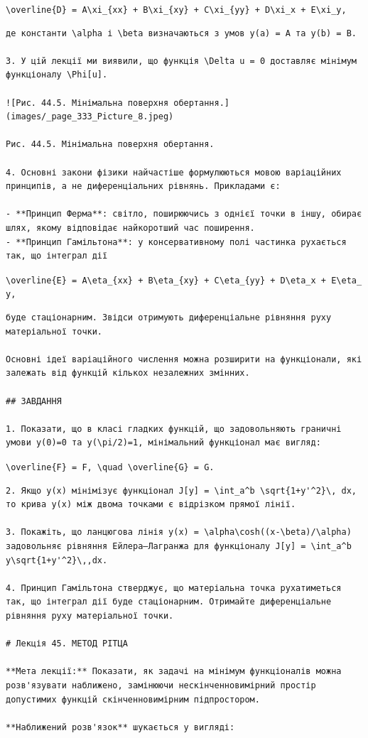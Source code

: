 \documentclass[
  ukrainian,
]{article}
\begin{document}
\texttt{\textbackslash{}overline\{D\}\ =\ A\textbackslash{}xi\_\{xx\}\ +\ B\textbackslash{}xi\_\{xy\}\ +\ C\textbackslash{}xi\_\{yy\}\ +\ D\textbackslash{}xi\_x\ +\ E\textbackslash{}xi\_y,}

\begin{verbatim}
де константи \alpha і \beta визначаються з умов y(a) = A та y(b) = B.

3. У цій лекції ми виявили, що функція \Delta u = 0 доставляє мінімум функціоналу \Phi[u].

![Рис. 44.5. Мінімальна поверхня обертання.](images/_page_333_Picture_8.jpeg)

Рис. 44.5. Мінімальна поверхня обертання.

4. Основні закони фізики найчастіше формулюються мовою варіаційних принципів, а не диференціальних рівнянь. Прикладами є:

- **Принцип Ферма**: світло, поширюючись з однієї точки в іншу, обирає шлях, якому відповідає найкоротший час поширення.
- **Принцип Гамільтона**: у консервативному полі частинка рухається так, що інтеграл дії
\end{verbatim}

\texttt{\textbackslash{}overline\{E\}\ =\ A\textbackslash{}eta\_\{xx\}\ +\ B\textbackslash{}eta\_\{xy\}\ +\ C\textbackslash{}eta\_\{yy\}\ +\ D\textbackslash{}eta\_x\ +\ E\textbackslash{}eta\_y,}

\begin{verbatim}
буде стаціонарним. Звідси отримують диференціальне рівняння руху матеріальної точки.

Основні ідеї варіаційного числення можна розширити на функціонали, які залежать від функцій кількох незалежних змінних.

## ЗАВДАННЯ

1. Показати, що в класі гладких функцій, що задовольняють граничні умови y(0)=0 та y(\pi/2)=1, мінімальний функціонал має вигляд:
\end{verbatim}

\texttt{\textbackslash{}overline\{F\}\ =\ F,\ \textbackslash{}quad\ \textbackslash{}overline\{G\}\ =\ G.}

\begin{verbatim}
2. Якщо y(x) мінімізує функціонал J[y] = \int_a^b \sqrt{1+y'^2}\, dx, то крива y(x) між двома точками є відрізком прямої лінії.

3. Покажіть, що ланцюгова лінія y(x) = \alpha\cosh((x-\beta)/\alpha) задовольняє рівняння Ейлера–Лагранжа для функціоналу J[y] = \int_a^b y\sqrt{1+y'^2}\,,dx.

4. Принцип Гамільтона стверджує, що матеріальна точка рухатиметься так, що інтеграл дії буде стаціонарним. Отримайте диференціальне рівняння руху матеріальної точки.

# Лекція 45. МЕТОД РІТЦА

**Мета лекції:** Показати, як задачі на мінімум функціоналів можна розв'язувати наближено, замінюючи нескінченновимірний простір допустимих функцій скінченновимірним підпростором.

**Наближений розв'язок** шукається у вигляді:
\end{verbatim}
\end{document}
